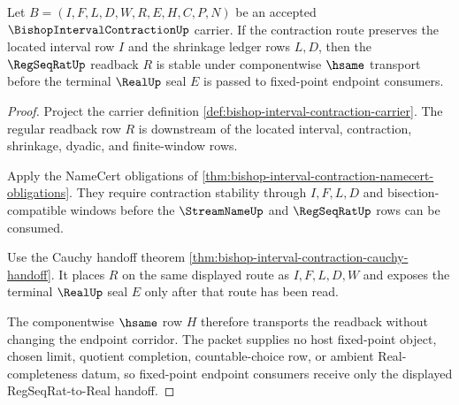 \begin{theorem}
\label{thm:bishop-interval-contraction-regseqrat-endpoint-stability}
Let $B=(I,F,L,D,W,R,E,H,C,P,N)$ be an accepted $\BishopIntervalContractionUp$ carrier. If the contraction route preserves the located interval row $I$ and the shrinkage ledger rows $L,D$, then the $\RegSeqRatUp$ readback $R$ is stable under componentwise $\hsame$ transport before the terminal $\RealUp$ seal $E$ is passed to fixed-point endpoint consumers.
\end{theorem}
\begin{proof}
Project the carrier definition \autoref{def:bishop-interval-contraction-carrier}. The regular readback row $R$ is downstream of the located interval, contraction, shrinkage, dyadic, and finite-window rows.

Apply the NameCert obligations of \autoref{thm:bishop-interval-contraction-namecert-obligations}. They require contraction stability through $I,F,L,D$ and bisection-compatible windows before the $\StreamNameUp$ and $\RegSeqRatUp$ rows can be consumed.

Use the Cauchy handoff theorem \autoref{thm:bishop-interval-contraction-cauchy-handoff}. It places $R$ on the same displayed route as $I,F,L,D,W$ and exposes the terminal $\RealUp$ seal $E$ only after that route has been read.

The componentwise $\hsame$ row $H$ therefore transports the readback without changing the endpoint corridor. The packet supplies no host fixed-point object, chosen limit, quotient completion, countable-choice row, or ambient Real-completeness datum, so fixed-point endpoint consumers receive only the displayed RegSeqRat-to-Real handoff.
\end{proof}

